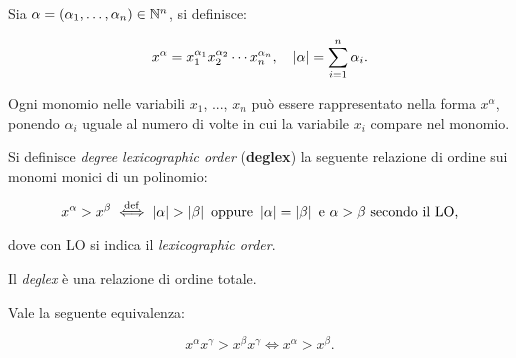 \documentclass[11pt]{scrbook}
\begin{document}
\begin{definition}
    Sia $\alpha = (\alpha_1, \ldots, \alpha_n) \in \mathbb N^n$, si definisce:
    
    \[ x^\alpha = x_1^{\alpha_1} x_2^{\alpha_2} \cdots x_n^{\alpha_n}, \quad
        \left|\alpha\right| = \sum_{i=1}^n \alpha_i. \]
\end{definition}

\begin{remark*}
    Ogni monomio nelle variabili $x_1$, ..., $x_n$ può essere rappresentato
    nella forma $x^\alpha$, ponendo $\alpha_i$ uguale al numero di volte
    in cui la variabile $x_i$ compare nel monomio.
\end{remark*}

\begin{definition}
    Si definisce \textit{degree lexicographic order} (\textbf{deglex}) la seguente
    relazione di ordine sui monomi monici di un polinomio:

    \[ x^\alpha > x^\beta \overset{\mathrm{def}}{\iff} \left|\alpha\right| > \left|\beta\right| \text{ oppure }  \\
        \left|\alpha\right| = \left|\beta\right| \text{ e } \alpha > \beta \text{ secondo il LO,} \]
        
    \vskip 0.1in
    
    dove con LO si indica il \textit{lexicographic order}.
\end{definition}

\begin{remark}
    Il \textit{deglex} è una relazione di ordine totale.
\end{remark}

\begin{proposition}
    \label{prop:moltiplicazione_disuguaglianza_deglex}
    Vale la seguente equivalenza:
    
    \[ x^\alpha x^\gamma > x^\beta x^\gamma \iff x^\alpha > x^\beta. \]
\end{proposition}
\end{document}
